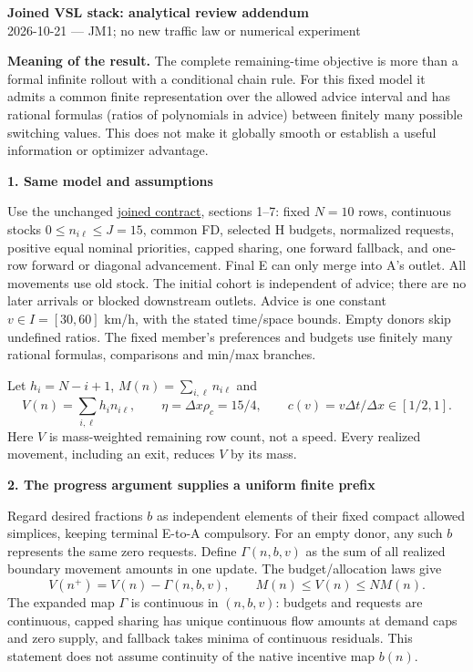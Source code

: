 \documentclass[10pt,a4paper]{article}
\newcommand{\head}[1]{\par\medskip\textbf{#1}\par}
\begin{document}
\begin{center}
{\large\bfseries Joined VSL stack: analytical review addendum}\\[3pt]
2026-10-21 --- JM1; no new traffic law or numerical experiment
\end{center}

\textbf{Meaning of the result.} The complete remaining-time objective is
more than a formal infinite rollout with a conditional chain rule. For this
fixed model it admits a common finite representation over the allowed
advice interval and has rational formulas (ratios of polynomials in advice)
between finitely many possible switching values. This does not make it globally smooth or establish
a useful information or optimizer advantage.

\head{1. Same model and assumptions}
Use the unchanged
\href{vsl_joined_candidate_contract_and_qualification.pdf}{joined contract},
sections 1--7: fixed $N=10$ rows, continuous stocks $0\leq n_{i\ell}\leq J=15$,
common FD, selected H budgets, normalized requests, positive equal nominal
priorities, capped sharing, one forward fallback, and one-row forward or
diagonal advancement. Final E can only merge into A's outlet. All movements
use old stock. The initial cohort is independent of advice; there are no
later arrivals or blocked downstream outlets. Advice is one constant
$v\in I=[30,60]$ km/h, with the stated time/space bounds. Empty donors skip
undefined ratios. The fixed member's preferences and budgets use finitely
many rational formulas, comparisons and min/max branches.

Let $h_i=N-i+1$, $M(n)=\sum_{i,\ell}n_{i\ell}$ and
\begin{equation}
 V(n)=\sum_{i,\ell}h_i n_{i\ell},\qquad
 \eta=\Delta x\rho_c=15/4,\qquad c(v)=v\Delta t/\Delta x\in[1/2,1].
 \label{eq:definitions}
\end{equation}
Here $V$ is mass-weighted remaining row count, not a speed. Every realized
movement, including an exit, reduces $V$ by its mass.

\head{2. The progress argument supplies a uniform finite prefix}
Regard desired fractions $b$ as independent elements of their fixed compact
allowed simplices, keeping terminal E-to-A compulsory. For an empty donor,
any such $b$ represents the same zero requests. Define $\Gamma(n,b,v)$ as
the sum of all realized boundary movement amounts in one update. The
budget/allocation laws give
\begin{equation}
 V(n^+)=V(n)-\Gamma(n,b,v),\qquad M(n)\leq V(n)\leq NM(n).
 \label{eq:progress}
\end{equation}
The expanded map $\Gamma$ is continuous in $(n,b,v)$: budgets and requests
are continuous, capped sharing has unique continuous flow amounts at demand
caps and zero supply, and fallback takes minima of continuous residuals.
This statement does not assume continuity of the native incentive map $b(n)$.
\end{document}
